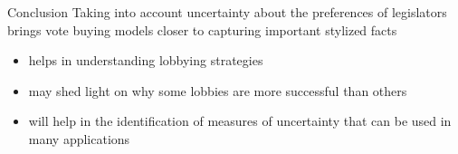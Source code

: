 \documentclass[handout]{beamer}
\begin{document}
\begin{frame}{Conclusion}
Taking into account uncertainty about the preferences of legislators brings vote buying models closer to capturing important stylized facts
\pause
\begin{itemize}[<+->]
		\item helps in understanding lobbying strategies
		\item may shed light on why some lobbies are more successful than others
		\item will help in the identification of measures of uncertainty that can be used in many applications
\end{itemize}

\end{frame}
\end{document}
